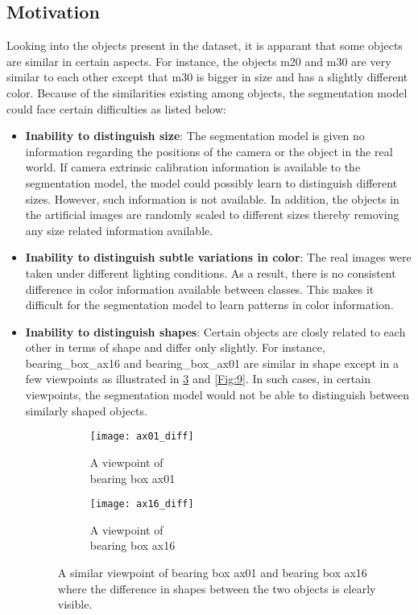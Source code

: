\documentclass[paper=a4,11pt,parskip=half,toc=listof]{scrartcl}
\begin{document}
	\subsection{Motivation}
		Looking into the objects present in the dataset, it is apparant that some objects are similar in certain aspects. For instance, the objects m20 and m30 are very similar to each other except that m30 is bigger in size and has a slightly different color. Because of the similarities existing among objects, the segmentation model could face certain difficulties as listed below:
		\begin{itemize}
			\item \textbf{Inability to distinguish size}: The segmentation model is given no information regarding the positions of the camera or the object in the real world. If camera extrinsic calibration information is available to the segmentation model, the model could possibly learn to distinguish different sizes. However, such information is not available. In addition, the objects in the artificial images are randomly scaled to different sizes thereby removing any size related information available.
			\item \textbf{Inability to distinguish subtle variations in color}: The real images were taken under different lighting conditions. As a result, there is no consistent difference in color information available between classes. This makes it difficult for the segmentation model to learn patterns in color information.
			\item \textbf{Inability to distinguish shapes}: Certain objects are closly related to each other in terms of shape and differ only slightly. For instance, bearing\_box\_ax16 and bearing\_box\_ax01 are similar in shape except in a few viewpoints as illustrated in \ref{Fig:8} and \ref{Fig:9}. In such cases, in certain viewpoints, the segmentation model would not be able to distinguish between similarly shaped objects.
			
\begin{figure}[!htb]
	\centering
	\begin{subfigure}{.3\textwidth}
  		\centering
  		\texttt{[image: ax01\_diff]}
  		\caption{A viewpoint of \\bearing box ax01}
  		\label{Fig:8a}
	\end{subfigure}%
	\begin{subfigure}{.3\textwidth}
  		\centering
  		\texttt{[image: ax16\_diff]}
  		\caption{A viewpoint of \\bearing box ax16}
  		\label{Fig:8b}
	\end{subfigure}%
	\caption{A similar viewpoint of bearing box ax01 and bearing box ax16 where the difference in shapes between the two objects is clearly visible.}
	\label{Fig:8}
\end{figure}


\end{itemize}
\end{document}
